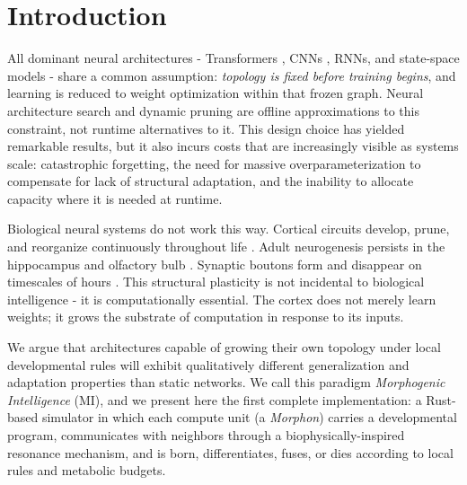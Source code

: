 \section{Introduction}
\label{sec:introduction}

All dominant neural architectures - Transformers \cite{vaswani2017attention}, CNNs \cite{lecun1998gradient}, RNNs, and state-space models \cite{gu2022s4} - share a common assumption: \emph{topology is fixed before training begins}, and learning is reduced to weight optimization within that frozen graph. Neural architecture search and dynamic pruning are offline approximations to this constraint, not runtime alternatives to it. This design choice has yielded remarkable results, but it also incurs costs that are increasingly visible as systems scale: catastrophic forgetting, the need for massive overparameterization to compensate for lack of structural adaptation, and the inability to allocate capacity where it is needed at runtime.

Biological neural systems do not work this way. Cortical circuits develop, prune, and reorganize continuously throughout life \cite{huttenlocher1979synaptic,sigaard2016development}. Adult neurogenesis persists in the hippocampus and olfactory bulb \cite{eriksson1998neurogenesis,ming2011adult}. Synaptic boutons form and disappear on timescales of hours \cite{trachtenberg2002long}. This structural plasticity is not incidental to biological intelligence - it is computationally essential. The cortex does not merely learn weights; it grows the substrate of computation in response to its inputs.

We argue that architectures capable of growing their own topology under local developmental rules will exhibit qualitatively different generalization and adaptation properties than static networks. We call this paradigm \emph{Morphogenic Intelligence} (MI), and we present here the first complete implementation: a Rust-based simulator in which each compute unit (a \emph{Morphon}) carries a developmental program, communicates with neighbors through a biophysically-inspired resonance mechanism, and is born, differentiates, fuses, or dies according to local rules and metabolic budgets.

